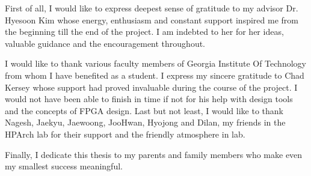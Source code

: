 \setcounter{equation}{0}
First of all, I would like to express deepest sense of gratitude to my advisor Dr. Hyesoon Kim whose energy, enthusiasm and constant support inspired me from the beginning till the end of the project. I am indebted to her for her ideas, valuable guidance and the encouragement throughout. 

I would like to thank various faculty members of Georgia Institute Of Technology from whom I have benefited as a student. 
I express my sincere gratitude to Chad Kersey whose support had proved invaluable during the course of the project. I would not have been able to finish in time if not for his help with design tools and the concepts of FPGA design. Last but not least, I would like to thank Nagesh, Jaekyu, Jaewoong, JooHwan, Hyojong and Dilan, my friends in the HPArch lab for their support and the friendly atmosphere in lab. 

Finally, I dedicate this thesis to my parents and family members who make even my smallest success meaningful.      
